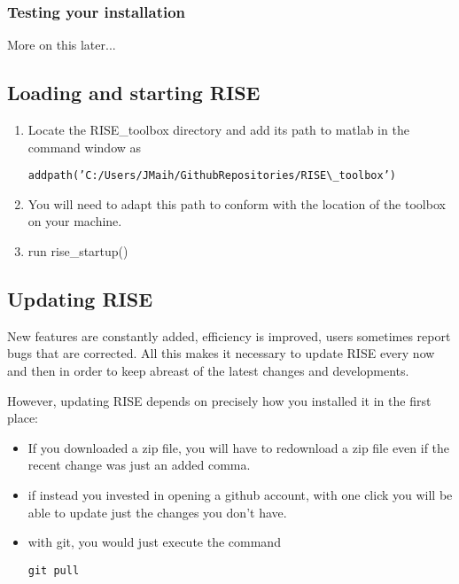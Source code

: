 \documentclass[letterpaper,10pt,english]{sphinxmanual}
\begin{document}
\subsubsection{Testing your installation}
\label{getting_started_folder/installation_configuration:testing-your-installation}
More on this later...


\subsection{Loading and starting RISE}
\label{getting_started_folder/installation_configuration:loading-and-starting-rise}\begin{enumerate}
\item {} 
Locate the RISE\_toolbox directory and add its path to matlab
in the command window as

\begin{Verbatim}[commandchars=\\\{\}]
addpath(’C:/Users/JMaih/GithubRepositories/RISE\_toolbox’)
\end{Verbatim}

\item {} 
You will need to adapt this path to conform with the location
of the toolbox on your machine.

\item {} 
run rise\_startup()

\end{enumerate}


\subsection{Updating RISE}
\label{getting_started_folder/installation_configuration:updating-rise}
New features are constantly added, efficiency is improved, users sometimes report bugs that are corrected.
All this makes it necessary to update RISE every now and then in order to keep abreast of the
latest changes and developments.

However, updating RISE depends on precisely how you installed it in the first place:
\begin{itemize}
\item {} 
If you downloaded a zip file, you will have to redownload a zip file even if the recent change was just an added comma.

\item {} 
if instead you invested in opening a github account, with one click you will be able to update just the changes you don't have.

\item {} 
with git, you would just execute the command

\begin{Verbatim}[commandchars=\\\{\}]
git pull
\end{Verbatim}

\end{itemize}
\end{document}

